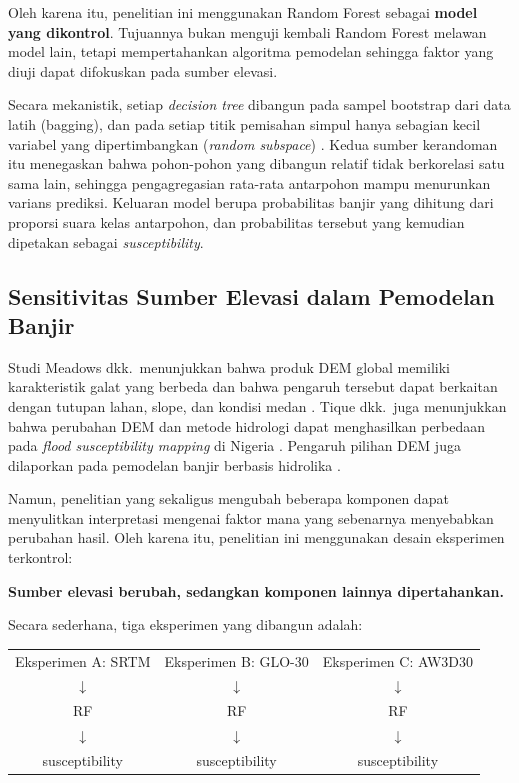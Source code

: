 \documentclass[12pt]{article}
\begin{document}
Oleh karena itu, penelitian ini menggunakan Random Forest sebagai
\textbf{model yang dikontrol}. Tujuannya bukan menguji kembali Random Forest
melawan model lain, tetapi mempertahankan algoritma pemodelan sehingga
faktor yang diuji dapat difokuskan pada sumber elevasi.

Secara mekanistik, setiap \textit{decision tree} dibangun pada sampel
bootstrap dari data latih (bagging), dan pada setiap titik pemisahan
simpul hanya sebagian kecil variabel yang dipertimbangkan (\textit{random
subspace}) \cite{breiman2001}. Kedua sumber kerandoman itu menegaskan bahwa
pohon-pohon yang dibangun relatif tidak berkorelasi satu sama lain, sehingga
pengagregasian rata-rata antarpohon mampu menurunkan varians prediksi.
Keluaran model berupa probabilitas banjir yang dihitung dari proporsi
suara kelas antarpohon, dan probabilitas tersebut yang kemudian dipetakan
sebagai \textit{susceptibility}.

\subsection{Sensitivitas Sumber Elevasi dalam Pemodelan Banjir}

Studi Meadows dkk.\ menunjukkan bahwa produk DEM global memiliki
karakteristik galat yang berbeda dan bahwa pengaruh tersebut dapat berkaitan
dengan tutupan lahan, slope, dan kondisi medan \cite{meadows2024}. Tique
dkk.\ juga menunjukkan bahwa perubahan DEM dan metode hidrologi dapat
menghasilkan perbedaan pada \textit{flood susceptibility mapping} di Nigeria
\cite{Tique2026}. Pengaruh pilihan DEM juga dilaporkan pada pemodelan banjir
berbasis hidrolika \cite{fatdillah2022,fikri2026}.

Namun, penelitian yang sekaligus mengubah beberapa komponen dapat
menyulitkan interpretasi mengenai faktor mana yang sebenarnya menyebabkan
perubahan hasil. Oleh karena itu, penelitian ini menggunakan desain
eksperimen terkontrol:

\begin{center}
\textbf{Sumber elevasi berubah, sedangkan komponen lainnya dipertahankan.}
\end{center}

Secara sederhana, tiga eksperimen yang dibangun adalah:

\begin{center}
\begin{tabular}{ccc}
Eksperimen A: SRTM & Eksperimen B: GLO-30 & Eksperimen C: AW3D30 \\
$\downarrow$ & $\downarrow$ & $\downarrow$ \\
RF & RF & RF \\
$\downarrow$ & $\downarrow$ & $\downarrow$ \\
susceptibility & susceptibility & susceptibility \\
\end{tabular}
\end{center}
\end{document}
